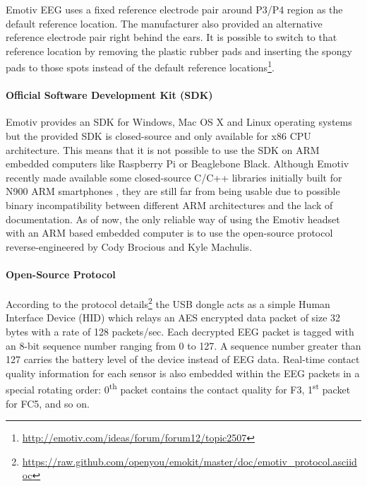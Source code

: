 \documentclass[12pt]{article}
\newcommand\mysubsubsubsection[1]{\paragraph{#1}\hspace{0pt}}
\numberwithin{equation}{section}
\numberwithin{figure}{section}
\numberwithin{table}{section}
\begin{document}
\par{
    Emotiv EEG uses a fixed reference electrode pair around P3/P4 region as the default
    reference location. The manufacturer also provided an alternative reference electrode
    pair right behind the ears. It is possible to switch to that reference location
    by removing the plastic rubber pads and inserting the spongy pads to those spots
    instead of the default reference locations\footnote{\url{http://emotiv.com/ideas/forum/forum12/topic2507}}.
}

\mysubsubsubsection{Official Software Development Kit (SDK)}

\par{
    Emotiv provides an SDK for Windows, Mac OS X and Linux operating systems but the provided SDK is
    closed-source and only available for x86 CPU architecture. This means that it is not possible
    to use the SDK on ARM embedded computers like Raspberry Pi or Beaglebone Black.
    Although Emotiv recently made available some closed-source C/C++ libraries initially
    built for N900 ARM smartphones \citep{stopczynski_smartphone_2011}, they are still far from being usable due to possible binary
    incompatibility between different ARM architectures and the lack of documentation. As of now,
    the only reliable way of using the Emotiv headset with an ARM based embedded computer is to use the
    open-source protocol reverse-engineered by Cody Brocious and Kyle Machulis.
}

\mysubsubsubsection{Open-Source Protocol}

\par{
    According to the protocol details\footnote{\url{https://raw.github.com/openyou/emokit/master/doc/emotiv_protocol.asciidoc}}
    the USB dongle acts as a simple Human Interface Device (HID) which relays an AES encrypted data packet of size 32 bytes with a rate of 128 packets/sec.
    Each decrypted EEG packet is tagged with an 8-bit sequence number ranging from 0 to 127.
    A sequence number greater than 127 carries the battery level of the device instead of EEG data.
    Real-time contact quality information for each sensor is also embedded within the EEG
    packets in a special rotating order: 0\textsuperscript{th} packet contains the contact quality for F3,
    1\textsuperscript{st} packet for FC5, and so on.
}
\end{document}
